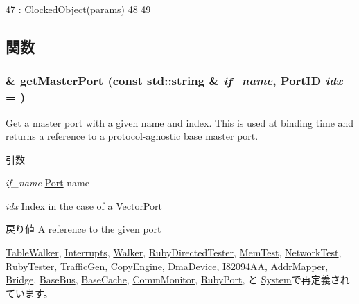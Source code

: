 \begin{DoxyCode}
47     : ClockedObject(params)
48 {
49 }
\end{DoxyCode}


\subsection{関数}
\hypertarget{classMemObject_adc4e675e51defbdd1e354dac729d0703}{
\subsubsection[{getMasterPort}]{ \& getMasterPort (const std::string \& {\em if\_\-name}, \/  {\bf PortID} {\em idx} = {})}}
\label{classMemObject_adc4e675e51defbdd1e354dac729d0703}
Get a master port with a given name and index. This is used at binding time and returns a reference to a protocol-\/agnostic base master port.


\begin{DoxyParams}{引数}
\item[{\em if\_\-name}]\hyperlink{classPort}{Port} name \item[{\em idx}]Index in the case of a VectorPort\end{DoxyParams}
\begin{DoxyReturn}{戻り値}
A reference to the given port 
\end{DoxyReturn}


\hyperlink{classArmISA_1_1TableWalker_adc4e675e51defbdd1e354dac729d0703}{TableWalker}, \hyperlink{classX86ISA_1_1Interrupts_ac66222ec5b6b7beb5d1189c07778bc8a}{Interrupts}, \hyperlink{classX86ISA_1_1Walker_adc4e675e51defbdd1e354dac729d0703}{Walker}, \hyperlink{classRubyDirectedTester_adc4e675e51defbdd1e354dac729d0703}{RubyDirectedTester}, \hyperlink{classMemTest_adc4e675e51defbdd1e354dac729d0703}{MemTest}, \hyperlink{classNetworkTest_adc4e675e51defbdd1e354dac729d0703}{NetworkTest}, \hyperlink{classRubyTester_adc4e675e51defbdd1e354dac729d0703}{RubyTester}, \hyperlink{classTrafficGen_a54ebb5edc195c159b56a39e6f15b9932}{TrafficGen}, \hyperlink{classCopyEngine_adc4e675e51defbdd1e354dac729d0703}{CopyEngine}, \hyperlink{classDmaDevice_adc4e675e51defbdd1e354dac729d0703}{DmaDevice}, \hyperlink{classX86ISA_1_1I82094AA_adc4e675e51defbdd1e354dac729d0703}{I82094AA}, \hyperlink{classAddrMapper_adc4e675e51defbdd1e354dac729d0703}{AddrMapper}, \hyperlink{classBridge_adc4e675e51defbdd1e354dac729d0703}{Bridge}, \hyperlink{classBaseBus_adc4e675e51defbdd1e354dac729d0703}{BaseBus}, \hyperlink{classBaseCache_adc4e675e51defbdd1e354dac729d0703}{BaseCache}, \hyperlink{classCommMonitor_adc4e675e51defbdd1e354dac729d0703}{CommMonitor}, \hyperlink{classRubyPort_adc4e675e51defbdd1e354dac729d0703}{RubyPort}, と \hyperlink{classSystem_adc4e675e51defbdd1e354dac729d0703}{System}で再定義されています。


